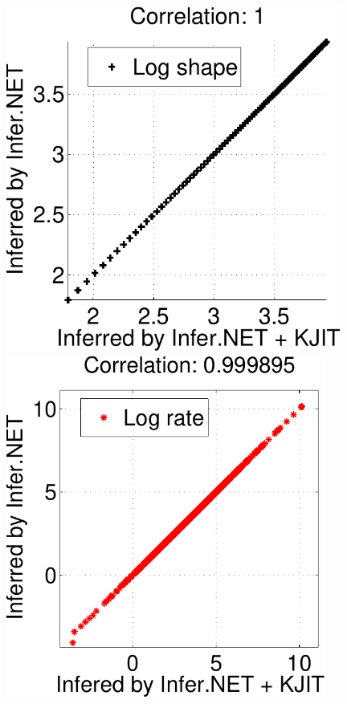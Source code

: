 \documentclass[25pt, a0paper, portrait, margin=0mm, innermargin=10mm,
     blockverticalspace=7mm, colspace=7mm, subcolspace=8mm]{tikzposter} %
\begin{document}
\begin{columns}
{  %
%
\begin{tikzfigure}
  \centering
  \includegraphics[width=11cm]{online/cg_post_shape-crop}
  \hspace{1.8cm}
  \includegraphics[width=10.5cm]{online/cg_post_rate-crop}

\end{tikzfigure}}
\end{columns}
\end{document}
